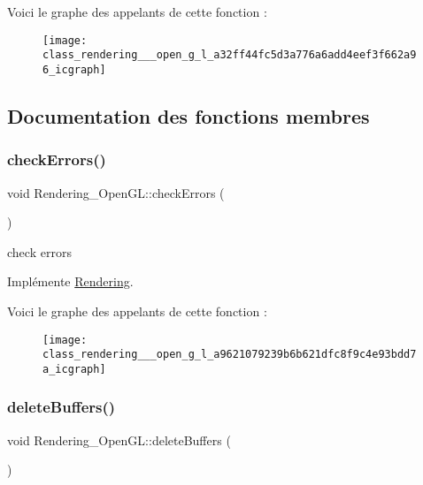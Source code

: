 Voici le graphe des appelants de cette fonction \+:\nopagebreak
\begin{figure}[H]
\begin{center}
\leavevmode
\texttt{[image: class\_rendering\_\_\_open\_g\_l\_a32ff44fc5d3a776a6add4eef3f662a96\_icgraph]}
\end{center}
\end{figure}


\subsection{Documentation des fonctions membres}
\mbox{\label{class_rendering___open_g_l_a9621079239b6b621dfc8f9c4e93bdd7a}} 
\subsubsection{\texorpdfstring{check\+Errors()}{checkErrors()}}
{\footnotesize\ttfamily void Rendering\+\_\+\+Open\+G\+L\+::check\+Errors (\begin{DoxyParamCaption}{ }\end{DoxyParamCaption})\hspace{0.3cm}{\ttfamily [virtual]}}



check errors 



Implémente \hyperlink{class_rendering_a93693702cf5a7709a7b1ddc7a7d3d8d3}{Rendering}.

Voici le graphe des appelants de cette fonction \+:\nopagebreak
\begin{figure}[H]
\begin{center}
\leavevmode
\texttt{[image: class\_rendering\_\_\_open\_g\_l\_a9621079239b6b621dfc8f9c4e93bdd7a\_icgraph]}
\end{center}
\end{figure}
\mbox{\label{class_rendering___open_g_l_aab5b195bb52751243f4944417f9ae7d5}} 
\subsubsection{\texorpdfstring{delete\+Buffers()}{deleteBuffers()}}
{\footnotesize\ttfamily void Rendering\+\_\+\+Open\+G\+L\+::delete\+Buffers (\begin{DoxyParamCaption}{ }\end{DoxyParamCaption})\hspace{0.3cm}{\ttfamily [virtual]}}



